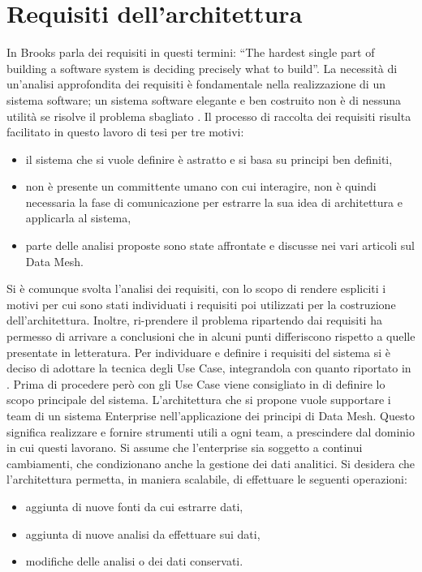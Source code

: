 \documentclass[a4paper,12pt]{report}
\begin{document}
\section{Requisiti dell'architettura}\label{requisiti}
In \cite{brooks_no_1987} Brooks parla dei requisiti in questi termini: ``The hardest single part of building a software system is deciding precisely what to build''. 
La necessità di un'analisi approfondita dei requisiti è fondamentale nella realizzazione di un sistema software; un sistema software elegante e ben costruito non è di nessuna utilità se risolve il problema sbagliato \cite{pressman2005software}.
Il processo di raccolta dei requisiti risulta facilitato in questo lavoro di tesi per tre motivi:
\begin{itemize}
    \item il sistema che si vuole definire è astratto e si basa su principi ben definiti,
    \item non è presente un committente umano con cui interagire, non è quindi necessaria la fase di comunicazione per estrarre la sua idea di architettura e applicarla al sistema,
    \item parte delle analisi proposte sono state affrontate e discusse nei vari articoli sul Data Mesh.
\end{itemize}
Si è comunque svolta l'analisi dei requisiti, con lo scopo di rendere espliciti i motivi per cui sono stati individuati i requisiti poi utilizzati per la costruzione dell'architettura.
Inoltre, ri-prendere il problema ripartendo dai requisiti ha permesso di arrivare a conclusioni che in alcuni punti differiscono rispetto a quelle presentate in letteratura.
Per individuare e definire i requisiti del sistema si è deciso di adottare la tecnica degli Use Case, integrandola con quanto riportato in \cite{dehghani_data_2022}.
Prima di procedere però con gli Use Case viene consigliato in \cite{cockburn2008writing} di definire lo scopo principale del sistema.
L'architettura che si propone vuole supportare i team di un  sistema Enterprise nell'applicazione dei principi di Data Mesh. 
Questo significa realizzare e fornire strumenti utili a ogni team, a prescindere dal dominio in cui questi lavorano.
Si assume che l'enterprise sia soggetto a continui cambiamenti, che condizionano anche la gestione dei dati analitici. 
Si desidera che l'architettura permetta, in maniera scalabile, di effettuare le seguenti operazioni:
\begin{itemize}
    \item aggiunta di nuove fonti da cui estrarre dati,
    \item aggiunta di nuove analisi da effettuare sui dati,
    \item modifiche delle analisi o dei dati conservati.
\end{itemize}
\end{document}
